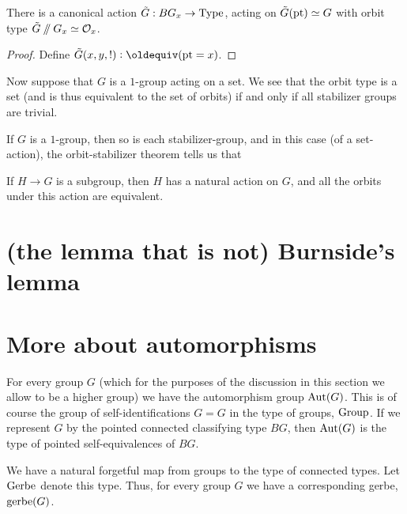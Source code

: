 \begin{theorem}
  There is a canonical action $\tilde G : BG_x \to \mathord{\mathrm{Type}}$,
  acting on $\tilde G({\mathord{\mathrm{pt}}})\simeq G$
  with orbit type $\tilde G\mathbin{/\kern-3pt/} G_x \simeq \mathcal O_x$.
\end{theorem}
\begin{proof}
  Define $\tilde G(x,y,!) \defeq (\pt = x)$.
\end{proof}

Now suppose that $G$ is a $1$-group acting on a set.
We see that the orbit type is a set
(and is thus equivalent to the set of orbits)
if and only if
all stabilizer groups are trivial.

If $G$ is a $1$-group,
then so is each stabilizer-group,
and in this case (of a set-action),
the orbit-stabilizer theorem
tells us that 

\begin{theorem}
  If $H \to G$ is a subgroup, then $H$ has a natural action on $G$,
  and all the orbits under this action are equivalent.
\end{theorem}

\section{(the lemma that is not) Burnside's lemma}
\label{sec:burnsides-lemma}

\section{More about automorphisms}
\label{sec:automorphisms}

For every group $G$ (which for the purposes of the discussion
in this section we allow to be a higher group)
we have the automorphism group $\operatorname{Aut}(G)$.
This is of course the group of self-identifications $G = G$ in the type of groups, $\mathord{\mathrm{Group}}$.
If we represent $G$ by the pointed connected classifying type $BG$,
then $\operatorname{Aut}(G)$ is the type of pointed self-equivalences of $BG$.

We have a natural forgetful map from groups to the type of connected types.
Let $\mathord{\mathrm{Gerbe}}$ denote this type.
Thus, for every group $G$ we have a corresponding gerbe, $\operatorname{gerbe}(G)$.

